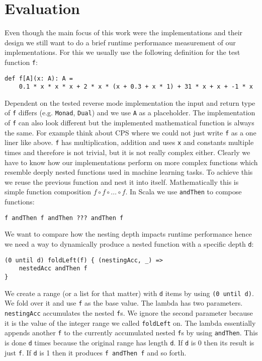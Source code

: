 \chapter{Evaluation}\label{sec:evaluation}

Even though the main focus of this work were the implementations and their design we still want to do a brief runtime performance measurement of our implementations. For this we usually use the following definition for the test function \lstinline{f}:
\begin{lstlisting}
def f[A](x: A): A =
    0.1 * x * x * x + 2 * x * (x + 0.3 + x * 1) + 31 * x + x + -1 * x
\end{lstlisting}
Dependent on the tested reverse mode implementation the input and return type of \lstinline{f} differs (e.g. \lstinline{Monad}, \lstinline{Dual}) and we use \lstinline{A} as a placeholder. The implementation of \lstinline{f} can also look different but the implemented mathematical function is always the same. For example think about CPS where we could not just write \lstinline{f} as a one liner like above.
\lstinline{f} has multiplication, addition and uses \lstinline{x} and constants multiple times and therefore is not trivial, but it is not really complex either. Clearly we have to know how our implementations perform on more complex functions which resemble deeply nested functions used in machine learning tasks. To achieve this we reuse the previous function and nest it into itself. Mathematically this is simple function composition
$f \circ f \circ \dots \circ f$. In Scala we use \lstinline{andThen} to compose functions:
\begin{lstlisting}
f andThen f andThen ??? andThen f
\end{lstlisting}
We want to compare how the nesting depth impacts runtime performance hence we need a way to dynamically produce a nested function with a specific depth \lstinline{d}:
\begin{lstlisting}
(0 until d) foldLeft(f) { (nestingAcc, _) =>
    nestedAcc andThen f
}
\end{lstlisting}
We create a range (or a list for that matter) with \lstinline{d} items by using \lstinline{(0 until d)}. We fold over it and use \lstinline{f} as the base value. The lambda has two parameters. \lstinline{nestingAcc} accumulates the nested \lstinline{f}s. We ignore the second parameter because it is the value of the integer range we called \lstinline{foldLeft} on. The lambda essentially appends another \lstinline{f} to the currently accumulated nested \lstinline{f}s by using \lstinline{andThen}. This is done \lstinline{d} times because the original range has length \lstinline{d}. If \lstinline{d} is 0 then its result is just \lstinline{f}. If \lstinline{d} is 1 then it produces \lstinline{f andThen f} and so forth.

